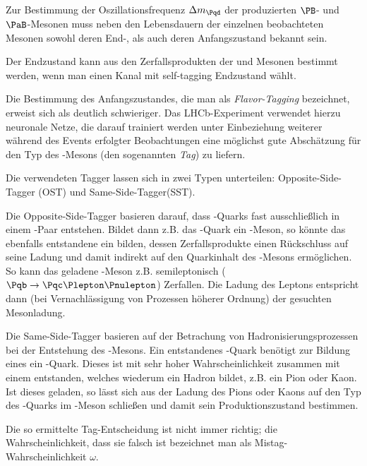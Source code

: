 Zur Bestimmung der Oszillationsfrequenz $\Delta m_{\Pqd}$ der produzierten $\PB$- und $\PaB$-Mesonen muss neben den Lebensdauern der einzelnen beobachteten Mesonen sowohl deren End-, als auch deren Anfangszustand bekannt sein.

Der Endzustand kann aus den Zerfallsprodukten der \PBz und \PaBz Mesonen bestimmt werden, wenn man einen Kanal mit self-tagging Endzustand wählt.

Die Bestimmung des Anfangszustandes, die man als \emph{Flavor-Tagging} bezeichnet, erweist sich als deutlich schwieriger.
Das LHCb-Experiment verwendet hierzu neuronale Netze, die darauf trainiert werden unter Einbeziehung weiterer während des Events erfolgter Beobachtungen eine möglichst gute Abschätzung für den Typ des \PB-Mesons (den sogenannten \emph{Tag}) zu liefern. %

Die verwendeten Tagger lassen sich in zwei Typen unterteilen: Opposite-Side-Tagger (OST) und Same-Side-Tagger(SST).

Die Opposite-Side-Tagger basieren darauf, dass \Pqb-Quarks fast ausschließlich in einem \Pqb\Paqb-Paar entstehen. Bildet dann z.B. das \Pqb-Quark ein \PaB-Meson, so könnte das ebenfalls entstandene \Paqb ein \PBp bilden, dessen Zerfallsprodukte einen Rückschluss auf seine Ladung und damit indirekt auf den Quarkinhalt des \PaB-Mesons ermöglichen.
So kann das geladene \PB-Meson z.B. semileptonisch ($\Pqb \to \Pqc \Plepton \Pnulepton$) Zerfallen. Die Ladung des Leptons entspricht dann (bei Vernachlässigung von Prozessen höherer Ordnung) der gesuchten Mesonladung.\cite{ost}

Die Same-Side-Tagger basieren auf der Betrachung von Hadronisierungsprozessen bei der Entstehung des \PB-Mesons.
Ein entstandenes \Pqb-Quark benötigt zur Bildung eines \APB ein \APqd-Quark.
Dieses ist mit sehr hoher Wahrscheinlichkeit zusammen mit einem \Pqd entstanden, welches wiederum ein Hadron bildet, z.B. ein Pion oder Kaon.
Ist dieses geladen, so lässt sich aus der Ladung des Pions oder Kaons auf den Typ des \Pqd-Quarks im \PB-Meson schließen und damit sein Produktionszustand bestimmen.

Die so ermittelte Tag-Entscheidung ist nicht immer richtig; die Wahrscheinlichkeit, dass sie falsch ist bezeichnet man als Mistag-Wahrscheinlichkeit $\omega$.


